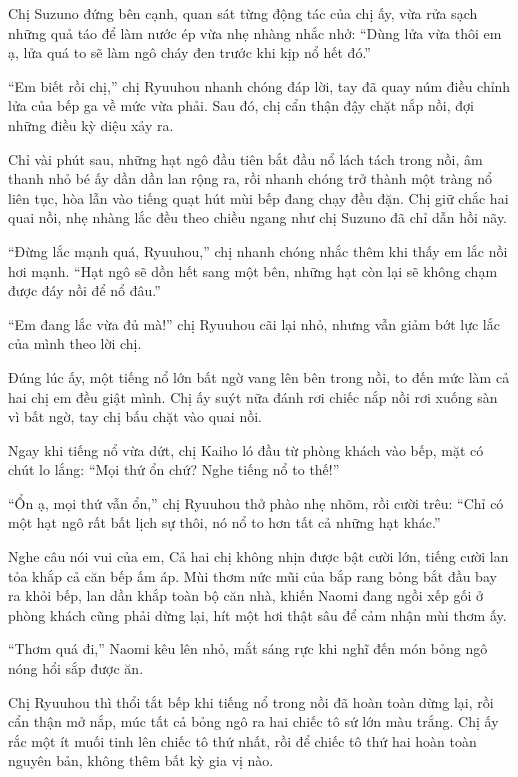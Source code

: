 \documentclass[../main.tex]{subfiles}
\begin{document}
Chị Suzuno đứng bên cạnh, quan sát từng động tác của chị ấy, vừa rửa sạch những quả táo để làm nước ép vừa nhẹ nhàng nhắc nhở: ``Dùng lửa vừa thôi em ạ, lửa quá to sẽ làm ngô cháy đen trước khi kịp nổ hết đó.''

``Em biết rồi chị,'' chị Ryuuhou nhanh chóng đáp lời, tay đã quay núm điều chỉnh lửa của bếp ga về mức vừa phải. Sau đó, chị cẩn thận đậy chặt nắp nồi, đợi những điều kỳ diệu xảy ra.

Chỉ vài phút sau, những hạt ngô đầu tiên bắt đầu nổ lách tách trong nồi, âm thanh nhỏ bé ấy dần dần lan rộng ra, rồi nhanh chóng trở thành một tràng nổ liên tục, hòa lẫn vào tiếng quạt hút mùi bếp đang chạy đều đặn. Chị giữ chắc hai quai nồi, nhẹ nhàng lắc đều theo chiều ngang như chị Suzuno đã chỉ dẫn hồi nãy.

``Đừng lắc mạnh quá, Ryuuhou,'' chị nhanh chóng nhắc thêm khi thấy em lắc nồi hơi mạnh. ``Hạt ngô sẽ dồn hết sang một bên, những hạt còn lại sẽ không chạm được đáy nồi để nổ đâu.''

``Em đang lắc vừa đủ mà!'' chị Ryuuhou cãi lại nhỏ, nhưng vẫn giảm bớt lực lắc của mình theo lời chị.

Đúng lúc ấy, một tiếng nổ lớn bất ngờ vang lên bên trong nồi, to đến mức làm cả hai chị em đều giật mình. Chị ấy suýt nữa đánh rơi chiếc nắp nồi rơi xuống sàn vì bất ngờ, tay chị bấu chặt vào quai nồi.

Ngay khi tiếng nổ vừa dứt, chị Kaiho ló đầu từ phòng khách vào bếp, mặt có chút lo lắng: ``Mọi thứ ổn chứ? Nghe tiếng nổ to thế!''

``Ổn ạ, mọi thứ vẫn ổn,'' chị Ryuuhou thở phào nhẹ nhõm, rồi cười trêu: ``Chỉ có một hạt ngô rất bất lịch sự thôi, nó nổ to hơn tất cả những hạt khác.''

Nghe câu nói vui của em, Cả hai chị không nhịn được bật cười lớn, tiếng cười lan tỏa khắp cả căn bếp ấm áp. Mùi thơm nức mũi của bắp rang bỏng bắt đầu bay ra khỏi bếp, lan dần khắp toàn bộ căn nhà, khiến Naomi đang ngồi xếp gối ở phòng khách cũng phải dừng lại, hít một hơi thật sâu để cảm nhận mùi thơm ấy.

``Thơm quá đi,'' Naomi kêu lên nhỏ, mắt sáng rực khi nghĩ đến món bỏng ngô nóng hổi sắp được ăn.

Chị Ryuuhou thì thổi tắt bếp khi tiếng nổ trong nồi đã hoàn toàn dừng lại, rồi cẩn thận mở nắp, múc tất cả bỏng ngô ra hai chiếc tô sứ lớn màu trắng. Chị ấy rắc một ít muối tinh lên chiếc tô thứ nhất, rồi để chiếc tô thứ hai hoàn toàn nguyên bản, không thêm bất kỳ gia vị nào.
\end{document}

